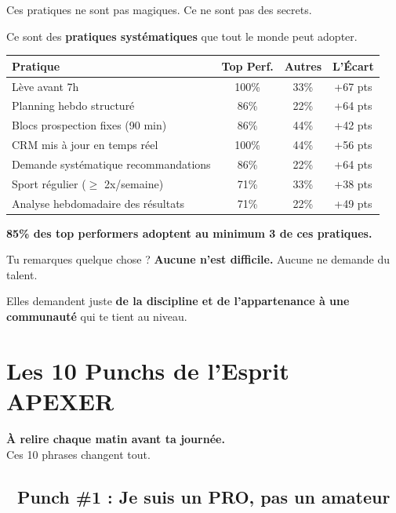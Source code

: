 \documentclass[12pt,a4paper,openany]{book}
\begin{document}
Ces pratiques ne sont pas magiques. Ce ne sont pas des secrets.

Ce sont des \textbf{pratiques systématiques} que tout le monde peut adopter.

\begin{center}
\begin{tabular}{|l|c|c|c|}
\toprule
\textbf{Pratique} & \textbf{Top Perf.} & \textbf{Autres} & \textbf{L'Écart} \\
\midrule
Lève avant 7h & 100\% & 33\% & +67 pts \\
Planning hebdo structuré & 86\% & 22\% & +64 pts \\
Blocs prospection fixes (90 min) & 86\% & 44\% & +42 pts \\
CRM mis à jour en temps réel & 100\% & 44\% & +56 pts \\
Demande systématique recommandations & 86\% & 22\% & +64 pts \\
Sport régulier ($\geq$ 2x/semaine) & 71\% & 33\% & +38 pts \\
Analyse hebdomadaire des résultats & 71\% & 22\% & +49 pts \\
\bottomrule
\end{tabular}
\end{center}

\vspace{0.5cm}

\textbf{85\% des top performers adoptent au minimum 3 de ces pratiques.}

Tu remarques quelque chose ? \textbf{Aucune n'est difficile.} Aucune ne demande du talent.

Elles demandent juste \textbf{de la discipline et de l'appartenance à une communauté} qui te tient au niveau.

\clearpage

\chapter{Les 10 Punchs de l'Esprit APEXER}

\vspace{0.5cm}
\begin{tcolorbox}[colback=apexred!10, colframe=apexred, boxrule=2pt]
\textbf{À relire chaque matin avant ta journée.}\\
Ces 10 phrases changent tout.
\end{tcolorbox}

\section*{🥊 Punch \#1 : Je suis un PRO, pas un amateur}
\end{document}
